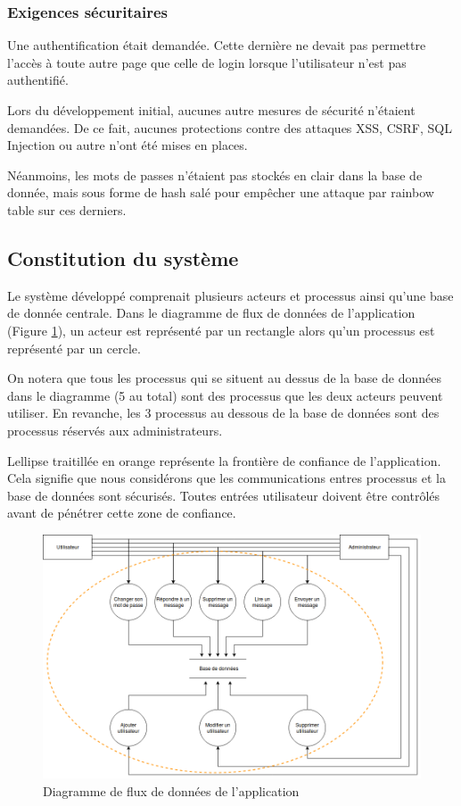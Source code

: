 \documentclass[12pt]{article}
\begin{document}
\subsubsection{Exigences sécuritaires}
Une authentification était demandée. Cette dernière ne devait pas permettre l'accès à toute autre page que celle de login lorsque l'utilisateur n'est pas authentifié.

Lors du développement initial, aucunes autre mesures de sécurité n'étaient demandées. De ce fait, aucunes protections contre des attaques XSS, CSRF, SQL Injection ou autre n'ont été mises en places.

Néanmoins, les mots de passes n'étaient pas stockés en clair dans la base de donnée, mais sous forme de hash salé pour empêcher une attaque par rainbow table sur ces derniers.

\newpage
\subsection{Constitution du système}

Le système développé comprenait plusieurs acteurs et processus ainsi qu'une base de donnée centrale. Dans le diagramme de flux de données de l'application (Figure \ref{flux}), un acteur est représenté par un rectangle alors qu'un processus est représenté par un cercle.

On notera que tous les processus qui se situent au dessus de la base de données dans le diagramme (5 au total) sont des processus que les deux acteurs peuvent utiliser. En revanche, les 3 processus au dessous de la base de données sont des processus réservés aux administrateurs.

Lellipse traitillée en orange représente la frontière de confiance de l'application. Cela signifie que nous considérons que les communications entres processus et la base de données sont sécurisés. Toutes entrées utilisateur doivent être contrôlés avant de pénétrer cette zone de confiance.

\begin{figure}[h]
 	\center
	\includegraphics[width=480px]{diagram}
 	\caption{Diagramme de flux de données de l'application} 
 	\label{flux}	
\end{figure}
\end{document}
